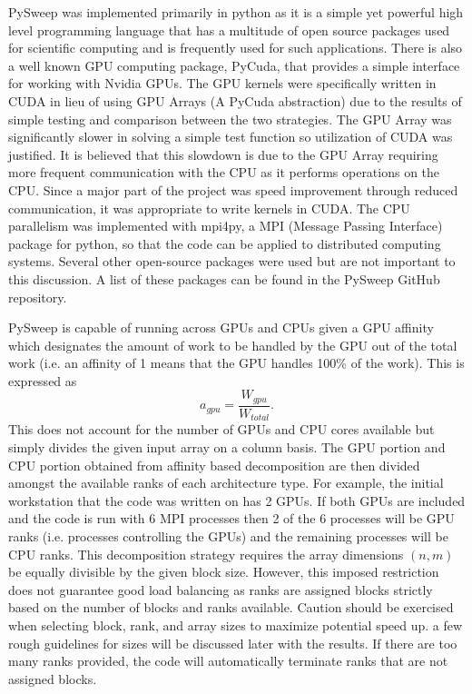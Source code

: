 \documentclass[review]{elsarticle}
\begin{document}
\par
PySweep was implemented primarily in python as it is a simple yet powerful high level programming language that has a multitude of open source packages used for scientific computing and is frequently used for such applications. There is also a well known GPU computing package, PyCuda, that provides a simple interface for working with Nvidia GPUs. The GPU kernels were specifically written in CUDA in lieu of using GPU Arrays (A PyCuda abstraction) due to the results of simple testing and comparison between the two strategies. The GPU Array was significantly slower in solving a simple test function so utilization of CUDA was justified. It is believed that this slowdown is due to the GPU Array requiring more frequent communication with the CPU as it performs operations on the CPU. Since a major part of the project was speed improvement through reduced communication, it was appropriate to write kernels in CUDA. The CPU parallelism was implemented with mpi4py, a MPI (Message Passing Interface) package for python, so that the code can be applied to distributed computing systems. Several other open-source packages were used but are not important to this discussion. A list of these packages can be found in the PySweep GitHub repository.

\par
PySweep is capable of running across GPUs and CPUs given a GPU affinity which designates the amount of work to be handled by the GPU out of the total work (i.e. an affinity of 1 means that the GPU handles 100\% of the work). This is expressed as
\begin{equation}
    a_{gpu} = \frac{W_{gpu}}{W_{total}}.
\end{equation}
This does not account for the number of GPUs and CPU cores available but simply divides the given input array on a column basis. The GPU portion and CPU portion obtained from affinity based decomposition are then divided amongst the available ranks of each architecture type. For example, the initial workstation that the code was written on has 2 GPUs. If both GPUs are included and the code is run with 6 MPI processes then 2 of the 6 processes will be GPU ranks (i.e. processes controlling the GPUs) and the remaining processes will be CPU ranks. This decomposition strategy requires the array dimensions $(n, m)$ be equally divisible by the given block size. However, this imposed restriction does not guarantee good load balancing as ranks are assigned blocks strictly based on the number of blocks and ranks available. Caution should be exercised when selecting block, rank, and array sizes to maximize potential speed up. a few rough guidelines for sizes will be discussed later with the results. If there are too many ranks provided, the code will automatically terminate ranks that are not assigned blocks.
\end{document}
